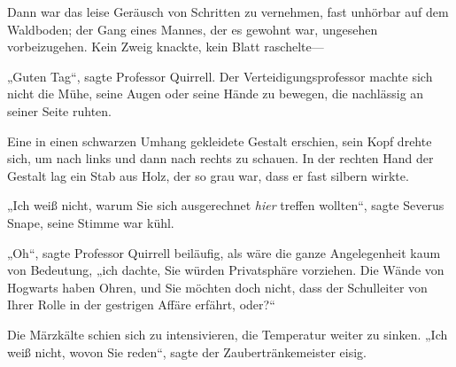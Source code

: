 Dann war das leise Geräusch von Schritten zu vernehmen, fast unhörbar auf dem Waldboden; der Gang eines Mannes, der es gewohnt war, ungesehen vorbeizugehen. Kein Zweig knackte, kein Blatt raschelte—

„Guten Tag“, sagte Professor Quirrell. Der Verteidigungsprofessor machte sich nicht die Mühe, seine Augen oder seine Hände zu bewegen, die nachlässig an seiner Seite ruhten.

Eine in einen schwarzen Umhang gekleidete Gestalt erschien, sein Kopf drehte sich, um nach links und dann nach rechts zu schauen. In der rechten Hand der Gestalt lag ein Stab aus Holz, der so grau war, dass er fast silbern wirkte.

„Ich weiß nicht, warum Sie sich ausgerechnet \emph{hier} treffen wollten“, sagte Severus Snape, seine Stimme war kühl.

„Oh“, sagte Professor Quirrell beiläufig, als wäre die ganze Angelegenheit kaum von Bedeutung, „ich dachte, Sie würden Privatsphäre vorziehen. Die Wände von Hogwarts haben Ohren, und Sie möchten doch nicht, dass der Schulleiter von Ihrer Rolle in der gestrigen Affäre erfährt, oder?“

Die Märzkälte schien sich zu intensivieren, die Temperatur weiter zu sinken. „Ich weiß nicht, wovon Sie reden“, sagte der Zaubertränkemeister eisig.

